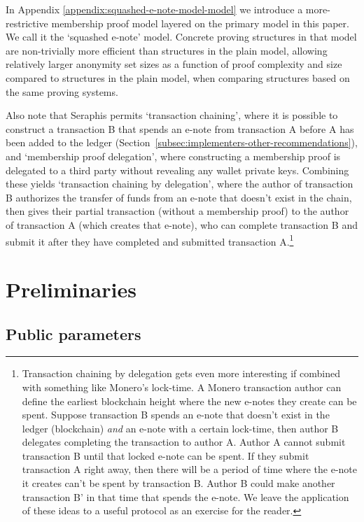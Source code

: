 In Appendix \ref{appendix:squashed-e-note-model-model} we introduce a more-restrictive membership proof model layered on the primary model in this paper. We call it the `squashed e-note' model. Concrete proving structures in that model are non-trivially more efficient than structures in the plain model, allowing relatively larger anonymity set sizes as a function of proof complexity and size compared to structures in the plain model, when comparing structures based on the same proving systems.

Also note that Seraphis permits `transaction chaining', where it is possible to construct a transaction B that spends an e-note from transaction A before A has been added to the ledger (Section~\ref{subsec:implementers-other-recommendations}), and `membership proof delegation', where constructing a membership proof is delegated to a third party without revealing any wallet private keys. Combining these yields `transaction chaining by delegation', where the author of transaction B authorizes the transfer of funds from an e-note that doesn't exist in the chain, then gives their partial transaction (without a membership proof) to the author of transaction A (which creates that e-note), who can complete transaction B and submit it after they have completed and submitted transaction A.\footnote{Transaction chaining by delegation gets even more interesting if combined with something like Monero's lock-time. A Monero transaction author can define the earliest blockchain height where the new e-notes they create can be spent. Suppose transaction B spends an e-note that doesn't exist in the ledger (blockchain) {\em and} an e-note with a certain lock-time, then author B delegates completing the transaction to author A. Author A cannot submit transaction B until that locked e-note can be spent. If they submit transaction A right away, then there will be a period of time where the e-note it creates can't be spent by transaction B. Author B could make another transaction B' in that time that spends the e-note. We leave the application of these ideas to a useful protocol as an exercise for the reader.}



\section{Preliminaries}
\label{sec:preliminaries}

\subsection{Public parameters}
\label{subsec:preliminaries-public-parameters}

